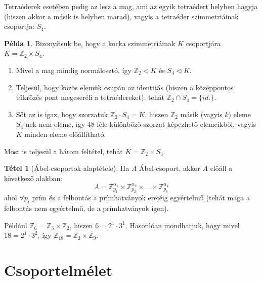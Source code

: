 \documentclass[12pt]{book}
\theoremstyle{plain} %
\theoremstyle{definition} %
\newtheorem{pl}{Példa}[section]
\newtheorem{theo/}{Tétel}[section]
\newenvironment{theo}
  {\renewcommand{\qedsymbol}{$\clubsuit$}%
   \pushQED{\qed}\begin{theo/}}
  {\popQED\end{theo/}}
\theoremstyle{remark}
\renewcommand\qedsymbol{$\blacksquare$}
\numberwithin{equation}{section}  %
\def\Z{\mathbb{Z}}
\begin{document}
	Tetraéderek esetében pedig az lesz a mag, ami az egyik tetraédert helyben hagyja (hiszen akkor a másik is helyben marad), vagyis a tetraéder szimmetriáinak csoportja: $S_4$.
	
	\begin{pl}
		Bizonyítsuk be, hogy a kocka szimmetriáinak $K$ csoportjára $K = \Z_2 \times S_4$.
		
		\begin{enumerate}
			\item Mivel a mag mindig normálosztó, így $\Z_2 \triangleleft K$ és $S_4\triangleleft K$.
			
			\item Teljesül, hogy közös elemük csupán az identitás (hiszen a középpontos tükrözés pont megcseréli a tetraédereket), tehát $\Z_2 \cap S_4 = \{id.\}$.
			
			\item Sőt az is igaz, hogy szorzatuk $\Z_2 \cdot S_4 = K$, hiszen $\Z_2$ másik (vagyis $k$) eleme $S_4$-nek nem eleme, így $48$ féle különböző szorzat képezhető elemeikből, vagyis $K$ minden eleme előállítható.
		\end{enumerate}
		
		Most is teljesül a három feltétel, tehát $K = \Z_2 \times S_4$.
	\end{pl}
	
	\begin{theo}[Ábel-csoportok alaptétele]
		Ha $A$ Ábel-csoport, akkor $A$ előáll a következő alakban:
		\[ A = \Z_{p_1}^{\alpha_1} \times \Z_{p_2}^{\alpha_2} \times \ldots \times \Z_{p_k}^{\alpha_k} \]
		ahol $\forall p_i$ prím és a felbontás a prímhatványok erejéig egyértelmű (tehát maga a felbontás nem egyértelmű, de a prímhatványok igen).
	\end{theo}
	
	Például $\Z_6 = \Z_3 \times \Z_2$, hiszen $6 = 2^1\cdot 3^1$. Hasonlóan mondhatjuk, hogy mivel $18 = 2^1\cdot 3^2$, így $\Z_{18} = \Z_2 \times \Z_9$.
	
	
	\chapter{Csoportelmélet}
\end{document}
